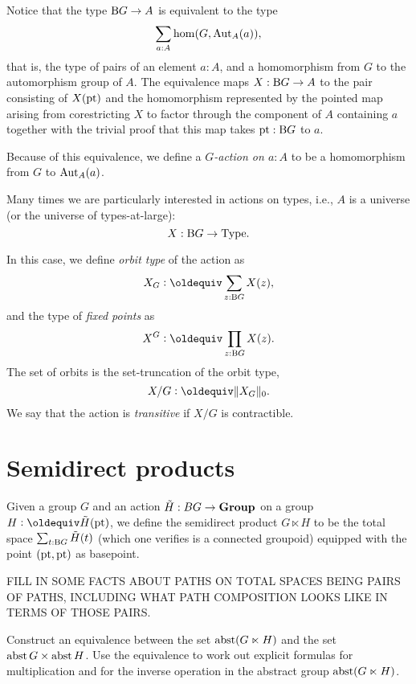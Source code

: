 Notice that the type $\operatorname{B}\! G \to A$ is equivalent to the type
\[
  \sum_{a:A}\hom(G,\operatorname{Aut}_A(a)),
\]
that is, the type of pairs of an element $a : A$,
and a homomorphism from $G$ to the automorphism group of $A$.
The equivalence maps $X:\operatorname{B}\! G\to A$ to the pair consisting of $X({\mathord{\mathrm{pt}}})$
and the homomorphism represented by the pointed map arising
from corestricting $X$ to factor through the component of $A$ containing $a$
together with the trivial proof that this map takes ${\mathord{\mathrm{pt}}}:\operatorname{B}\! G$ to $a$.

Because of this equivalence,
we define a \emph{$G$-action on $a:A$}
to be a homomorphism from $G$ to $\operatorname{Aut}_A(a)$.

Many times we are particularly interested in actions on types,
i.e., $A$ is a universe (or the universe of types-at-large):
\[
  X : \operatorname{B}\! G \to \mathord{\mathrm{Type}}.
\]

In this case, we define \emph{orbit type} of the action as
\[
  X_G \defeq \sum_{z:\B G} X(z),
\]
and the type of \emph{fixed points} as
\[
  X^G \defeq \prod_{z:\B G} X(z).
\]
The set of orbits is the set-truncation of the orbit type,
\[
  X / G \defeq \Trunc{X_G}_0.
\]
We say that the action is \emph{transitive} if $X / G$ is contractible.

\section{Semidirect products}
\label{sec:Semidirect-products}

\begin{definition}\label{def:semidirect-product}
  Given a group $G$ and an action $\tilde H : BG \to \mathbf{Group}$ on a group $H \defeq \tilde H(\pt)$, we define the semidirect product $G
  \ltimes H$ to be the total space $\sum_{t:\operatorname{B}\! G} \tilde H(t)$ (which one verifies is a connected groupoid) equipped with the point
  $({\mathord{\mathrm{pt}}},{\mathord{\mathrm{pt}}})$ as basepoint.
\end{definition}

FILL IN SOME FACTS ABOUT PATHS ON TOTAL SPACES BEING PAIRS OF PATHS, INCLUDING WHAT PATH COMPOSITION LOOKS LIKE IN TERMS OF THOSE PAIRS.

\begin{exercise}
  Construct an equivalence between the set $\operatorname{abst} (G \ltimes H)$ and the set $\operatorname{abst} G \times \operatorname{abst} H$.  Use the equivalence to work out
  explicit formulas for multiplication and for the inverse operation in the abstract group $\operatorname{abst} (G \ltimes H)$.
\end{exercise}

